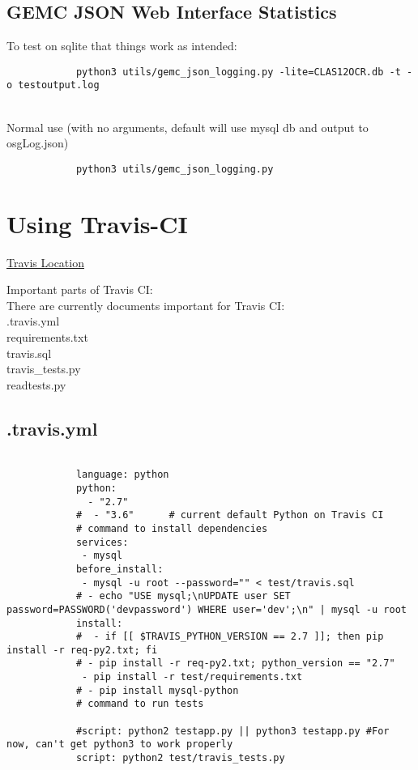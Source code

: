     \subsection*{GEMC JSON Web Interface Statistics}
         To test on sqlite that things work as intended: 
         \begin{lstlisting}
            python3 utils/gemc_json_logging.py -lite=CLAS12OCR.db -t -o testoutput.log
        \end{lstlisting}
        ~\\
        \newline
        Normal use (with no arguments, default will use mysql db and output to osgLog.json)
        \begin{lstlisting}
            python3 utils/gemc_json_logging.py 
        \end{lstlisting}


\section{Using Travis-CI}
    \href{https://travis-ci.org/}{Travis Location}
    
    Important parts of Travis CI:\\
    There are currently documents important for Travis CI:\\
    
    .travis.yml\\
    requirements.txt\\
    travis.sql\\
    travis\_tests.py\\
    readtests.py\\
    
    \subsection{.travis.yml}
        
        \begin{lstlisting}
        
            language: python
            python:
              - "2.7"
            #  - "3.6"      # current default Python on Travis CI
            # command to install dependencies
            services:
             - mysql
            before_install:
             - mysql -u root --password="" < test/travis.sql
            # - echo "USE mysql;\nUPDATE user SET password=PASSWORD('devpassword') WHERE user='dev';\n" | mysql -u root
            install:
            #  - if [[ $TRAVIS_PYTHON_VERSION == 2.7 ]]; then pip install -r req-py2.txt; fi
            # - pip install -r req-py2.txt; python_version == "2.7"
             - pip install -r test/requirements.txt
            # - pip install mysql-python
            # command to run tests
            
            #script: python2 testapp.py || python3 testapp.py #For now, can't get python3 to work properly
            script: python2 test/travis_tests.py
        \end{lstlisting}
    

